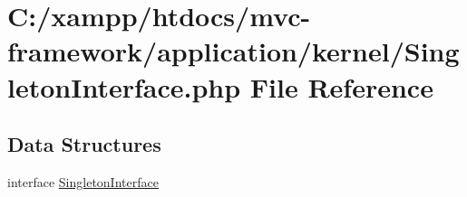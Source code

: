 \hypertarget{_singleton_interface_8php}{}\section{C\+:/xampp/htdocs/mvc-\/framework/application/kernel/\+Singleton\+Interface.php File Reference}
\label{_singleton_interface_8php}
\subsection*{Data Structures}
\begin{DoxyCompactItemize}
\item 
interface \hyperlink{interface_singleton_interface}{Singleton\+Interface}
\end{DoxyCompactItemize}
